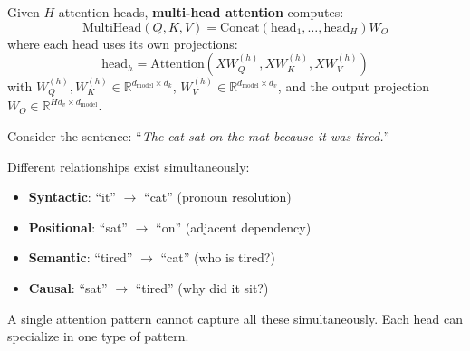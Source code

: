 \begin{definition}
    Given $H$ attention heads, \textbf{multi-head attention} computes:
    \[
        \text{MultiHead}(Q, K, V) = \text{Concat}(\text{head}_1, \ldots, \text{head}_H) W_O
    \]
    where each head uses its own projections:
    \[
        \text{head}_h = \text{Attention}(XW_Q^{(h)}, XW_K^{(h)}, XW_V^{(h)})
    \]
    with $W_Q^{(h)}, W_K^{(h)} \in \mathbb{R}^{d_{\text{model}} \times d_k}$, $W_V^{(h)} \in \mathbb{R}^{d_{\text{model}} \times d_v}$, and the output projection $W_O \in \mathbb{R}^{Hd_v \times d_{\text{model}}}$.
\end{definition}

\begin{remark}
    Consider the sentence: ``\textit{The cat sat on the mat because it was tired.}''

    Different relationships exist simultaneously:
    \begin{itemize}
        \item \textbf{Syntactic}: ``it'' $\to$ ``cat'' (pronoun resolution)
        \item \textbf{Positional}: ``sat'' $\to$ ``on'' (adjacent dependency)
        \item \textbf{Semantic}: ``tired'' $\to$ ``cat'' (who is tired?)
        \item \textbf{Causal}: ``sat'' $\to$ ``tired'' (why did it sit?)
    \end{itemize}

    A single attention pattern cannot capture all these simultaneously. Each head can specialize in one type of pattern.
\end{remark}

